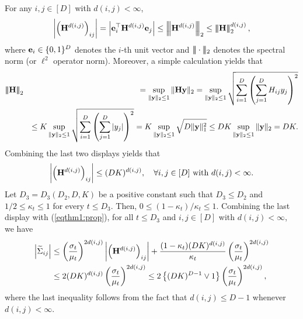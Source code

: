 \documentclass[11pt,a4paper,final]{article}
\numberwithin{equation}{section}
\theoremstyle{remark}
\newcommand{\bfe}{{\bf e}}
\newcommand{\bH}{{\bf H}}
\newcommand{\by}{{\bf y}}
\newcommand{\be}{\begin{equation}}
\newcommand{\ee}{\end{equation}}
\newcommand{\bean}{\setlength\arraycolsep{1pt}\begin{eqnarray*}}
\newcommand{\eean}{\end{eqnarray*}}
\newcommand{\tnorm}[1]{\vert\mkern-3mu\vert\mkern-3mu\vert #1 \vert\mkern-3mu\vert\mkern-3mu\vert}
\newcommand{\Tnorm}[1]{\left\vert\mkern-3mu\left\vert\mkern-3mu\left\vert #1 \right\vert\mkern-3mu\right\vert\mkern-3mu\right\vert}
\begin{document}
For any $i,j \in [D]$ with $d(i,j) < \infty$,
\bean
\left\vert \left( \bH^{d(i,j)} \right)_{ij} \right\vert
= \left\vert \bfe_{i}^{\top} \bH^{d(i,j)} \bfe_{j} \right\vert 
\leq \Tnorm{\bH^{d(i,j)}}_2
\leq \Tnorm{\bH}_2^{d(i,j)},
\eean
where $\bfe_{i} \in \{0,1\}^{D}$ denotes the $i$-th unit vector and $\tnorm{\cdot}_2$ denotes the spectral norm (or $\ell^2$ operator norm).
Moreover, a simple calculation yields that
\bean
\Tnorm{\bH }_2
&&  = \sup_{\| \by \|_2 \leq 1} \| \bH \by \|_2 
= \sup_{\| \by \|_2 \leq 1} \sqrt{ \sum_{i=1}^{D} \left( \sum_{j=1}^{D} H_{ij} y_j \right)^2 }
\\
&& \leq K \sup_{\| \by \|_2 \leq 1} \sqrt{ \sum_{i=1}^{D} \left( \sum_{j=1}^{D} \vert y_j \vert \right)^2 }
= K  \sup_{\| \by \|_2 \leq 1} \sqrt{ D \| \by \|_1^2 }
\leq D K \sup_{\| \by \|_2 \leq 1} \| \by \|_2 = DK.
\eean
Combining the last two displays yields that
\bean
\left\vert \left( \bH^{d(i,j)} \right)_{ij} \right\vert
\leq (DK)^{d(i,j)},
\quad \forall i,j \in [D] \text{ with }d(i,j) < \infty.
\eean
Let $D_{3} = D_{3}(D_{2}, D,K)$ be a positive constant such that $D_{3} \leq D_{2}$ and
$1/2 \leq \kappa_{t} \leq 1$ for every $t \leq D_{3}$.
Then, $0 \leq ( 1- \kappa_{t}) / \kappa_t \leq 1$.
Combining the last display with (\ref{eqthm1:prop}), for all $t \leq D_{3}$ and $i,j \in [D]$ with $d(i,j) < \infty$, we have
\be
\begin{split}
 \left\vert \widetilde \Sigma_{ij} \right\vert
&  \leq \left( \frac{\sigma_t}{\mu_t} \right)^{2 d(i,j)} \left\vert \left( \bH^{d(i,j)} \right)_{ij} \right\vert 
+ \frac{ (1 - \kappa_t)  ( D K )^{ d(i,j)}  }{ \kappa_t } \left( \frac{\sigma_{t}}{\mu_{t}} \right)^{2 d(i,j)}
\\
& \leq 2  (DK)^{d(i,j)} \left( \frac{\sigma_t}{\mu_t} \right)^{2 d(i,j)}
\leq  2 \left\{  (DK)^{D-1} \vee 1 \right\} \left( \frac{\sigma_t}{\mu_t} \right)^{2 d(i,j)},
\label{eqthm1:cov_bd}
\end{split}
\ee
where the last inequality follows from the fact that $d(i,j) \leq D-1$ whenever $d(i,j) < \infty$.
\end{document}
